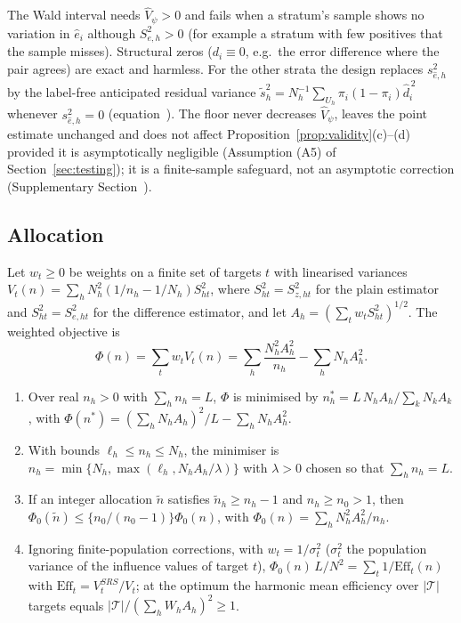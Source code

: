 \begin{remark}\label{rem:zero-var}
The Wald interval needs $\hat V_\psi>0$ and fails when a stratum's sample shows no variation in $\hat e_i$ although $S^2_{e,h}>0$ (for example a stratum with
few positives that the sample misses). Structural zeros ($d_i\equiv0$, e.g.\ the error difference where the pair agrees) are exact and harmless. For the other strata the
design replaces $s^2_{\hat e,h}$ by the label-free anticipated residual variance $\tilde s^2_h=N_h^{-1}\sum_{U_h}\pi_i(1-\pi_i)\hat d_i^{\,2}$
whenever $s^2_{\hat e,h}=0$ (equation~). The floor never decreases $\hat V_\psi$, leaves the point estimate unchanged and does not
affect Proposition~\ref{prop:validity}(c)--(d) provided it is asymptotically negligible (Assumption (A5) of Section~\ref{sec:testing}); it is a finite-sample safeguard, not an asymptotic correction (Supplementary Section~).
\end{remark}

\subsection{Allocation}\label{sec:theory-alloc}

Let $w_t\ge0$ be weights on a finite set of targets $t$ with linearised variances $V_t(n)=\sum_hN_h^2(1/n_h-1/N_h)S^2_{ht}$, where $S^2_{ht}=S^2_{z,ht}$ for the plain estimator
and $S^2_{ht}=S^2_{e,ht}$ for the difference estimator, and let $A_h=(\sum_tw_tS^2_{ht})^{1/2}$. The weighted objective is
\begin{equation}\label{eq:objective}
\Phi(n)=\sum_tw_tV_t(n)=\sum_h\frac{N_h^2A_h^2}{n_h}-\sum_hN_hA_h^2 .
\end{equation}

\begin{proposition}\label{prop:allocation}
\begin{enumerate}
\item[(a)] Over real $n_h>0$ with $\sum_hn_h=L$, $\Phi$ is minimised by
$n_h^\ast=L\,N_hA_h/\sum_kN_kA_k$, with $\Phi(n^\ast)=(\sum_hN_hA_h)^2/L-\sum_hN_hA_h^2$.
\item[(b)] With bounds $\ell_h\le n_h\le N_h$, the minimiser is $n_h=\min\{N_h,\max(\ell_h,N_hA_h/\lambda)\}$ with
$\lambda>0$ chosen so that $\sum_hn_h=L$.
\item[(c)] If an integer allocation $\tilde n$ satisfies $\tilde n_h\ge n_h-1$ and $n_h\ge n_0>1$, then $\Phi_0(\tilde n)\le\{n_0/(n_0-1)\}\Phi_0(n)$, with
$\Phi_0(n)=\sum_hN_h^2A_h^2/n_h$.
\item[(d)] Ignoring finite-population corrections, with $w_t=1/\sigma^2_t$ ($\sigma^2_t$ the population variance of the influence values of target $t$),
$\Phi_0(n)\,L/N^2=\sum_t1/\mathrm{Eff}_t(n)$ with $\mathrm{Eff}_t=V^{SRS}_t/V_t$; at the optimum the harmonic mean efficiency over $|\mathcal T|$ targets equals
$|\mathcal T|/(\sum_hW_hA_h)^2\ge1$.
\end{enumerate}
\end{proposition}

